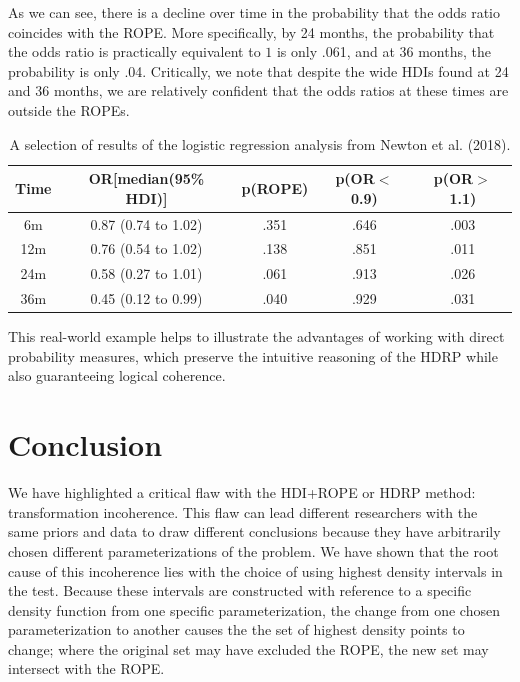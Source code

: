 \documentclass[9pt,twocolumn,twoside]{cidlab-draft}\templatetype{cidlab-invited}
\newcommand{\hdr}{HDRP}
\begin{document}
As we can see, there is a decline over time in the probability that the odds ratio coincides with the ROPE. More specifically, by 24 months, the probability that the odds ratio is practically equivalent to $1$ is only .061, and at 36 months, the probability is only .04. Critically, we note that despite the wide HDIs found at 24 and 36 months, we are relatively confident that the odds ratios at these times are outside the ROPEs.


\begin{table}
\caption{A selection of results of the logistic regression analysis from Newton et al. (2018).}\label{tab:newton}
\begin{tabular}{ccccc}\hline
    Time & OR[median(95\% HDI)] & p(ROPE) & p(OR$<$0.9) & p(OR$>$1.1)  \\\hline
   6m  & 0.87 (0.74 to 1.02) & .351 & .646 & .003\\
   12m & 0.76 (0.54 to 1.02) & .138 & .851 & .011\\
   24m & 0.58 (0.27 to 1.01) & .061 & .913 & .026\\
   36m & 0.45 (0.12 to 0.99) & .040 & .929 & .031\\\hline
\end{tabular}
\end{table}

This real-world example helps to illustrate the advantages of working with direct probability measures, which preserve the intuitive reasoning of the \hdr{} while also guaranteeing logical coherence.
 
\section*{Conclusion}
We have highlighted a critical flaw with the HDI+ROPE or \hdr{} method: transformation incoherence. This flaw can lead different researchers with the same priors and data to draw different conclusions because they have arbitrarily chosen different parameterizations of the problem. We have shown that the root cause of this incoherence lies with the choice of using highest density intervals in the test. Because these intervals are constructed with reference to a specific density function from one specific parameterization, the change from one chosen parameterization to another causes the the set of highest density points to change; where the original set may have excluded the ROPE, the new set may intersect with the ROPE. 
\end{document}
